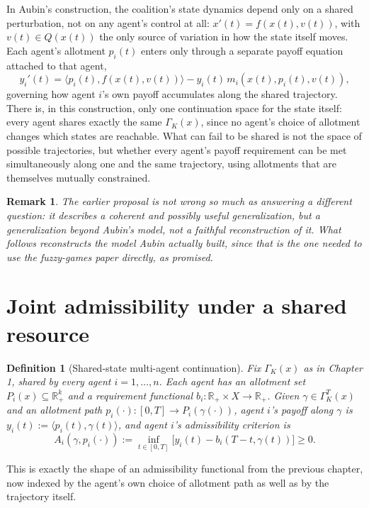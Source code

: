 \documentclass[11pt]{report}
\newtheorem{definition}{Definition}[chapter]
\newtheorem{remark}{Remark}[chapter]
\begin{document}
In Aubin's construction, the coalition's state dynamics depend only on
a shared perturbation, not on any agent's control at all:
$x'(t) = f(x(t), v(t))$, with $v(t) \in Q(x(t))$ the only source of
variation in how the state itself moves. Each agent's allotment
$p_i(t)$ enters only through a separate payoff equation attached to
that agent,
\[
y_i'(t) = \langle p_i(t), f(x(t),v(t)) \rangle - y_i(t)\, m_i(x(t), p_i(t), v(t)),
\]
governing how agent $i$'s own payoff accumulates along the shared
trajectory. There is, in this construction, only one continuation
space for the state itself: every agent shares exactly the same
$\Gamma_K(x)$, since no agent's choice of allotment changes which
states are reachable. What can fail to be shared is not the space of
possible trajectories, but whether every agent's payoff requirement can
be met simultaneously along one and the same trajectory, using
allotments that are themselves mutually constrained.

\begin{remark}
The earlier proposal is not wrong so much as answering a different
question: it describes a coherent and possibly useful generalization,
but a generalization \emph{beyond} Aubin's model, not a faithful
reconstruction of it. What follows reconstructs the model Aubin
actually built, since that is the one needed to use the fuzzy-games
paper directly, as promised.
\end{remark}

\section*{Joint admissibility under a shared resource}

\begin{definition}[Shared-state multi-agent continuation]
Fix $\Gamma_K(x)$ as in Chapter 1, shared by every agent
$i = 1, \dots, n$. Each agent has an allotment set
$P_i(x) \subseteq \mathbb{R}_+^k$ and a requirement functional
$b_i : \mathbb{R}_+ \times X \to \mathbb{R}_+$. Given
$\gamma \in \Gamma_K^T(x)$ and an allotment path
$p_i(\cdot) : [0,T] \to P_i(\gamma(\cdot))$, agent $i$'s payoff along
$\gamma$ is $y_i(t) := \langle p_i(t), \gamma(t) \rangle$, and agent
$i$'s admissibility criterion is
\[
A_i(\gamma, p_i(\cdot)) := \inf_{t \in [0,T]} \big[ y_i(t) - b_i(T-t, \gamma(t)) \big] \geq 0.
\]
\end{definition}

This is exactly the shape of an admissibility functional from the
previous chapter, now indexed by the agent's own choice of allotment
path as well as by the trajectory itself.
\end{document}

